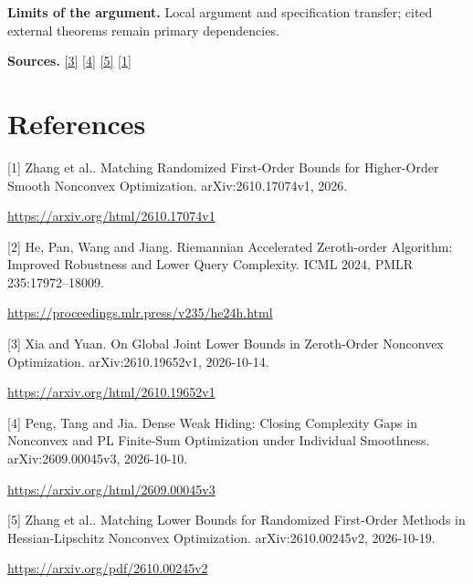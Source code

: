 \documentclass[10pt,a4paper]{article}
\begin{document}
\textbf{Limits of the argument.} Local argument and specification transfer; cited external theorems remain primary dependencies.

\textbf{Sources.} \href{https://arxiv.org/html/2610.19652v1}{[3]} \href{https://arxiv.org/html/2609.00045v3}{[4]} \href{https://arxiv.org/pdf/2610.00245v2}{[5]} \href{https://arxiv.org/html/2610.17074v1}{[1]}

\section{References}
[1] Zhang et al.. Matching Randomized First-Order Bounds for Higher-Order Smooth Nonconvex Optimization. arXiv:2610.17074v1, 2026.

\url{https://arxiv.org/html/2610.17074v1}

[2] He, Pan, Wang and Jiang. Riemannian Accelerated Zeroth-order Algorithm: Improved Robustness and Lower Query Complexity. ICML 2024, PMLR 235:17972--18009.

\url{https://proceedings.mlr.press/v235/he24h.html}

[3] Xia and Yuan. On Global Joint Lower Bounds in Zeroth-Order Nonconvex Optimization. arXiv:2610.19652v1, 2026-10-14.

\url{https://arxiv.org/html/2610.19652v1}

[4] Peng, Tang and Jia. Dense Weak Hiding: Closing Complexity Gaps in Nonconvex and PL Finite-Sum Optimization under Individual Smoothness. arXiv:2609.00045v3, 2026-10-10.

\url{https://arxiv.org/html/2609.00045v3}

[5] Zhang et al.. Matching Lower Bounds for Randomized First-Order Methods in Hessian-Lipschitz Nonconvex Optimization. arXiv:2610.00245v2, 2026-10-19.

\url{https://arxiv.org/pdf/2610.00245v2}
\end{document}
